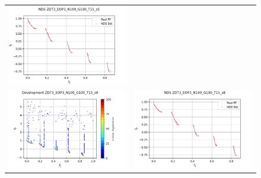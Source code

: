 \begin{figure}[H]
\begin{tabular}{c c}
    \includegraphics[scale=0.45]{figures/ZDT3_EOP3_N100_G100_T15/s5_nds.png}\\
    \includegraphics[scale=0.45]{figures/ZDT3_EOP3_N100_G100_T15/s8_dev.png} &
    \includegraphics[scale=0.45]{figures/ZDT3_EOP3_N100_G100_T15/s8_nds.png}\\

\end{tabular}
\end{figure}
